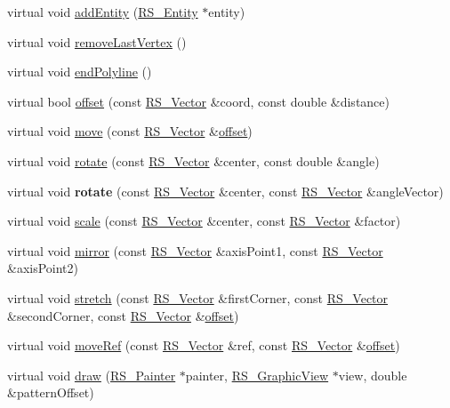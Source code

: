 \begin{DoxyCompactItemize}
\item 
virtual void \hyperlink{classRS__Polyline_aafff6c653dc3e20919c67aebf1a5f360}{add\-Entity} (\hyperlink{classRS__Entity}{R\-S\-\_\-\-Entity} $\ast$entity)
\item 
virtual void \hyperlink{classRS__Polyline_aec480c11325f76daaff862aa14057926}{remove\-Last\-Vertex} ()
\item 
virtual void \hyperlink{classRS__Polyline_a2834b4d5c98626923fabc51b3d0fe0cc}{end\-Polyline} ()
\item 
virtual bool \hyperlink{classRS__Polyline_a2683132714cc2e90f2b01488432bddc0}{offset} (const \hyperlink{classRS__Vector}{R\-S\-\_\-\-Vector} \&coord, const double \&distance)
\item 
virtual void \hyperlink{classRS__Polyline_ab6ff92cfe9189e3be4fedc2ea8d43219}{move} (const \hyperlink{classRS__Vector}{R\-S\-\_\-\-Vector} \&\hyperlink{classRS__Polyline_a2683132714cc2e90f2b01488432bddc0}{offset})
\item 
virtual void \hyperlink{classRS__Polyline_a84ccdc026db5a43b52f3826ef61c248c}{rotate} (const \hyperlink{classRS__Vector}{R\-S\-\_\-\-Vector} \&center, const double \&angle)
\item 
\hypertarget{classRS__Polyline_ad291dfa05982ed026fb67e7e29771a09}{virtual void {\bfseries rotate} (const \hyperlink{classRS__Vector}{R\-S\-\_\-\-Vector} \&center, const \hyperlink{classRS__Vector}{R\-S\-\_\-\-Vector} \&angle\-Vector)}\label{classRS__Polyline_ad291dfa05982ed026fb67e7e29771a09}

\item 
virtual void \hyperlink{classRS__Polyline_ade00fbea20f8626f05f0bf6937ae0d53}{scale} (const \hyperlink{classRS__Vector}{R\-S\-\_\-\-Vector} \&center, const \hyperlink{classRS__Vector}{R\-S\-\_\-\-Vector} \&factor)
\item 
virtual void \hyperlink{classRS__Polyline_a77b309ccbe14b4dc6dda86adca1aad71}{mirror} (const \hyperlink{classRS__Vector}{R\-S\-\_\-\-Vector} \&axis\-Point1, const \hyperlink{classRS__Vector}{R\-S\-\_\-\-Vector} \&axis\-Point2)
\item 
virtual void \hyperlink{classRS__Polyline_afcfda617198716fc9df013a35a413781}{stretch} (const \hyperlink{classRS__Vector}{R\-S\-\_\-\-Vector} \&first\-Corner, const \hyperlink{classRS__Vector}{R\-S\-\_\-\-Vector} \&second\-Corner, const \hyperlink{classRS__Vector}{R\-S\-\_\-\-Vector} \&\hyperlink{classRS__Polyline_a2683132714cc2e90f2b01488432bddc0}{offset})
\item 
virtual void \hyperlink{classRS__Polyline_ae536074179d5f4df20ac8a4ef3197a3e}{move\-Ref} (const \hyperlink{classRS__Vector}{R\-S\-\_\-\-Vector} \&ref, const \hyperlink{classRS__Vector}{R\-S\-\_\-\-Vector} \&\hyperlink{classRS__Polyline_a2683132714cc2e90f2b01488432bddc0}{offset})
\item 
virtual void \hyperlink{classRS__Polyline_a5929c0e9251d1b770570b2ee7edbc8ce}{draw} (\hyperlink{classRS__Painter}{R\-S\-\_\-\-Painter} $\ast$painter, \hyperlink{classRS__GraphicView}{R\-S\-\_\-\-Graphic\-View} $\ast$view, double \&pattern\-Offset)
\end{DoxyCompactItemize}
